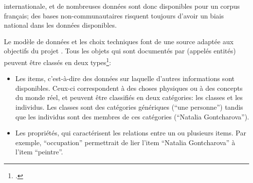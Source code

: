 internationale, et de nombreuses données sont donc disponibles pour un corpus français; des bases non-communautaires risquent toujours d'avoir un biais national dans les données disponibles.

Le modèle de données et les choix techniques font de \wkd{} une source adaptée aux objectifs du projet \ktb{}. Tous les objets qui sont documentés par \wkd{} (appelés entités) peuvent être classés en deux types\footcite[p. 51-52]{mika_introducing_2014}: 

\begin{itemize}
	\item Les items, c'est-à-dire des données sur laquelle d'autres informations sont disponibles. Ceux-ci correspondent à des choses physiques ou à des concepts du monde réel, et peuvent être classifiés en deux catégories: les classes et les individus. Les classes sont des catégories génériques (\enquote{une personne}) tandis que les individus sont des membres de ces catégories (\enquote{Natalia Gontcharova}).
	\item Les propriétés, qui caractérisent les relations entre un ou plusieurs items. Par exemple, \enquote{occupation} permettrait de lier l'item \enquote{Natalia Gontcharova} à l'item \enquote{peintre}.
\end{itemize}

